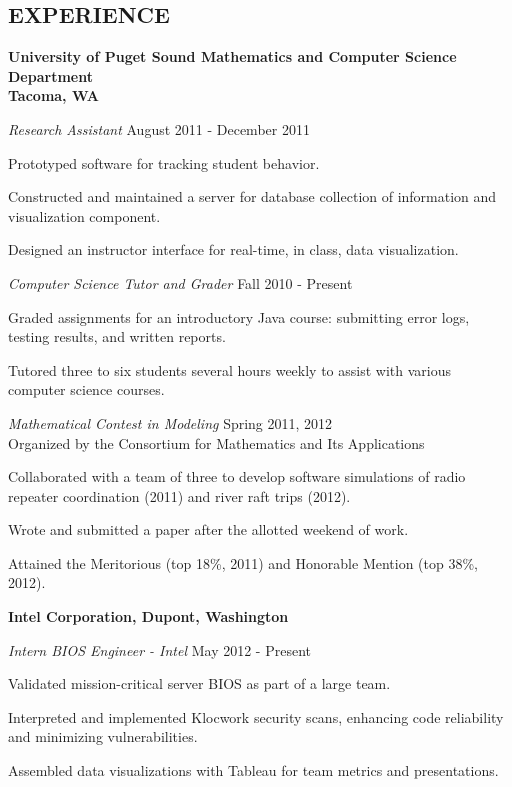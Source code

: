 \documentclass[line,margin]{res}
\newenvironment{itemize*}%
  {\begin{itemize}%
    \setlength{\parsep}{0pt}
    \setlength{\itemsep}{0pt}%
    \setlength{\parskip}{0pt}}%
  {\end{itemize}}
\begin{document}
\begin{resume}
\section{EXPERIENCE} 
\textbf{University of Puget Sound
Mathematics and Computer Science Department\\
Tacoma, WA}

{\sl Research Assistant} \hfill August 2011 - December 2011
\begin{itemize*}
    \item Prototyped software for tracking student behavior.
    \item Constructed and maintained a server for database collection of 
      information and visualization component.
    \item Designed an instructor interface for real-time, in class, data 
      visualization.
\end{itemize*}            

{\sl Computer Science Tutor and Grader} \hfill Fall 2010 - Present
\begin{itemize*}  
    \item Graded assignments for an introductory Java course: submitting 
      error logs, testing results, and written reports.
    \item Tutored three to six students several hours weekly to assist with 
      various computer science courses.
\end{itemize*}

{\sl Mathematical Contest in Modeling} \hfill Spring 2011, 2012\\
Organized by the Consortium for Mathematics and Its Applications
\begin{itemize*}
\item Collaborated with a team of three to develop software 
  simulations of radio repeater coordination (2011) and river raft trips 
  (2012).
\item Wrote and submitted a paper after the allotted weekend of work.
\item Attained the Meritorious (top 18\%, 2011) and Honorable 
    Mention (top 38\%, 2012).
\end{itemize*}

\textbf{Intel Corporation, Dupont, Washington}

{\sl Intern BIOS Engineer - Intel} \hfill May 2012 - Present
\begin{itemize*}
    \item Validated mission-critical server BIOS as part of a large team.
    \item Interpreted and implemented Klocwork security scans, enhancing 
        code reliability and minimizing vulnerabilities.
    \item Assembled data visualizations with Tableau for team metrics and 
        presentations.
\end{itemize*}            


\end{resume}
\end{document}
